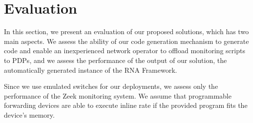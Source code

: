 % 
% 






\section{Evaluation}
\label{sec:evaluation:evaluation}

In this section, we present an evaluation of our proposed solutions, which has two main aspects. We assess the ability of our code generation mechanism to generate code and enable an inexperienced network operator to offload monitoring scripts to PDPs, and we assess the performance of the output of our solution, the automatically generated instance of the RNA Framework.

Since we use emulated switches for our deployments, we assess only the performance of the Zeek monitoring system. We assume that programmable forwarding devices are able to execute inline rate if the provided program fits the device's memory.
















